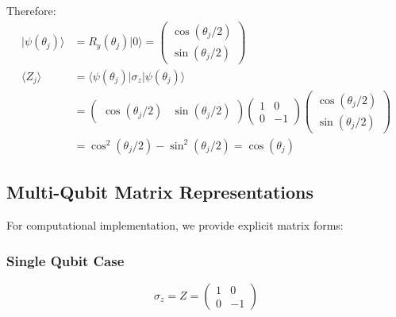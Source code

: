 \documentclass[11pt]{article}
\begin{document}
Therefore:
\begin{align}
|\psi(\theta_j)\rangle &= R_y(\theta_j)|0\rangle = \begin{pmatrix}
\cos(\theta_j/2) \\
\sin(\theta_j/2)
\end{pmatrix} \\
\langle Z_j \rangle &= \langle \psi(\theta_j)|\sigma_z|\psi(\theta_j)\rangle \\
&= \begin{pmatrix} \cos(\theta_j/2) & \sin(\theta_j/2) \end{pmatrix} 
\begin{pmatrix} 1 & 0 \\ 0 & -1 \end{pmatrix} 
\begin{pmatrix} \cos(\theta_j/2) \\ \sin(\theta_j/2) \end{pmatrix} \\
&= \cos^2(\theta_j/2) - \sin^2(\theta_j/2) = \cos(\theta_j)
\label{eq:expectation_calculation}
\end{align}

\subsection{Multi-Qubit Matrix Representations}

For computational implementation, we provide explicit matrix forms:

\subsubsection{Single Qubit Case}
\begin{equation}
\sigma_z = Z = \begin{pmatrix} 1 & 0 \\ 0 & -1 \end{pmatrix}
\label{eq:pauli_z_matrix}
\end{equation}
\end{document}
